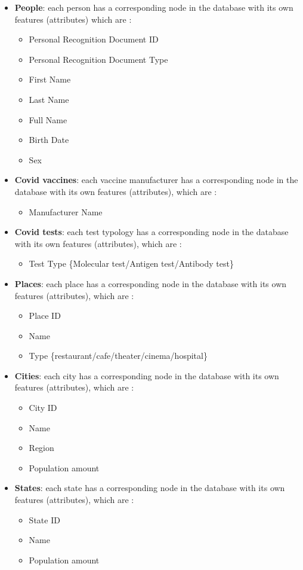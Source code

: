 \documentclass{article}[IEEEtran]
\begin{document}
\begin{itemize}
\item \textbf{People}: each person has a corresponding node in the database with its own features (attributes) which are :
    \begin{itemize}
    \item Personal Recognition Document ID
    \item Personal Recognition Document Type
    \item First Name
    \item Last Name
    \item Full Name
    \item Birth Date
    \item Sex
    \end{itemize}
    
\item \textbf{Covid vaccines}: each vaccine manufacturer has a corresponding node in the database with its own features (attributes), which are :
\begin{itemize}
\item Manufacturer Name
\end{itemize}

\item \textbf{Covid tests}: each test typology has a corresponding node in the database with its own features (attributes), which are :
\begin{itemize}
\item Test Type \{Molecular test/Antigen test/Antibody test\}
\end{itemize}

\item \textbf{Places}: each place has a corresponding node in the database with its own features (attributes), which are :
\begin{itemize}
\item Place ID
\item Name
\item Type \{restaurant/cafe/theater/cinema/hospital\}
\end{itemize}

\item \textbf{Cities}: each city has a corresponding node in the database with its own features (attributes), which are :
\begin{itemize}
\item City ID
\item Name
\item Region
\item Population amount
\end{itemize}

\item \textbf{States}: each state has a corresponding node in the database with its own features (attributes), which are :
\begin{itemize}
\item State ID
\item Name
\item Population amount
\end{itemize}


\end{itemize}
\end{document}
